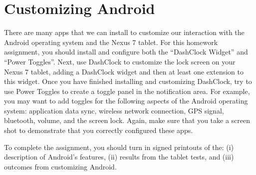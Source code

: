 \section*{Customizing Android}

There are many apps that we can install to customize our interaction with the Android operating system and the Nexus 7
tablet.  For this homework assignment, you should install and configure both the ``DashClock Widget'' and ``Power
Toggles''.  Next, use DashClock to customize the lock screen on your Nexus 7 tablet, adding a DashClock widget and then
at least one extension to this widget.  Once you have finished installing and customizing DashClock, try to use 
Power Toggles to create a toggle panel in the notification area.  For example, you may want to add toggles for the
following aspects of the Android operating system: application data sync, wireless network connection, GPS signal,
bluetooth, volume, and the screen lock.  Again, make sure that you take a screen shot to demonstrate that you correctly
configured these apps.

To complete the assignment, you should turn in signed printouts of the: (i) description of Android's features, (ii)
results from the tablet tests, and (iii) outcomes from customizing Android.



